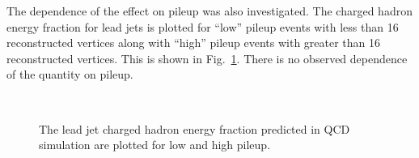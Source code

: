 The dependence of the effect on pileup was also investigated. The
charged hadron energy fraction for lead jets is plotted for ``low''
pileup events with less than 16 reconstructed vertices along with
``high'' pileup events with greater than 16 reconstructed vertices.
This is shown in Fig.~\ref{fig:qcdPU}. There is no observed dependence
of the quantity on pileup.

\begin{figure}[h!]
  \begin{center}
     ~~
    \caption{ The lead jet charged hadron energy fraction predicted in QCD
    simulation are plotted for low and high pileup.    }
    \label{fig:qcdPU}
  \end{center} 
\end{figure}
